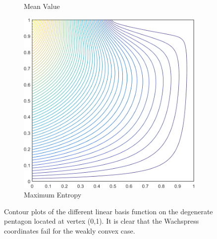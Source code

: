 \begin{figure}
{\begin{subfigure}[b]{0.39\textwidth}
		\caption{Mean Value}
	\end{subfigure}
	\hspace{1.5cm}
	\begin{subfigure}[b]{0.39\textwidth}
		\centering
		\includegraphics[width=\textwidth]{figures/sec_BF/deg_square_MAXENT1_contour_b5.png}
		\caption{Maximum Entropy}
	\end{subfigure}
}
\caption[Contour plots of the linear basis functions on the degenerate pentagon.]{Contour plots of the different linear basis function on the degenerate pentagon located at vertex (0,1). It is clear that the Wachspress coordinates fail for the weakly convex case.}
\label{fig::2D_Summary_deg_square_basis_functions}
\end{figure}

